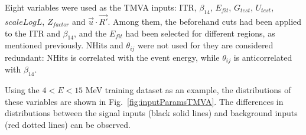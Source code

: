 Eight variables were used as the TMVA inputs: ITR, $\beta_{14}$, $E_{fit}$, $G_{test}$, $U_{test}$, $scaleLogL$, $Z_{factor}$ and $\vec{u}\cdot \vec{R'}$. Among them, the beforehand cuts had been applied to the ITR and $\beta_{14}$, and the $E_{fit}$ had been selected for different regions, as mentioned previously. NHits and $\theta_{ij}$ were not used for they are considered redundant: NHits is correlated with the event energy, while $\theta_{ij}$ is anticorrelated with $\beta_{14}$. 

Using the $4<E<15$ MeV training dataset as an example, the distributions of these variables are shown in Fig.~\ref{fig:inputParamsTMVA}. The differences in distributions between the signal inputs (black solid lines) and background inputs (red dotted lines) can be observed.

\begin{figure}[htbp]
	\centering
\end{figure}
